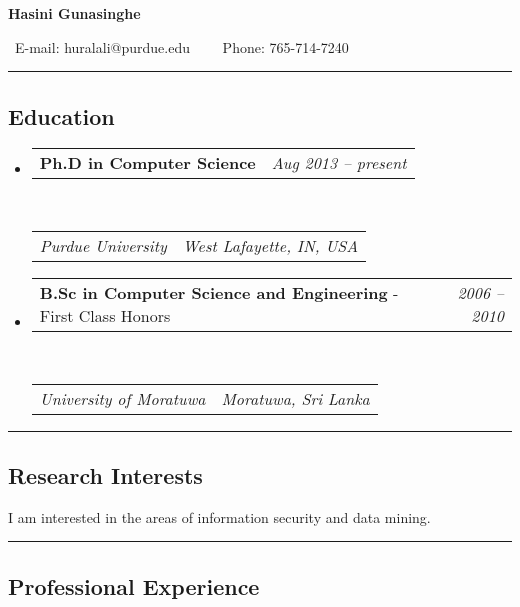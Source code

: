 \documentclass[10pt,letterpaper]{article}
\makeatletter
\newcommand{\headerrow}[2]
{\begin{tabular*}{\linewidth}{l@{\extracolsep{\fill}}r}
	#1 &
	#2 \\
\end{tabular*}}
\makeatother
\begin{document}
\begin{center}
{\LARGE \textbf{Hasini Gunasinghe}}

\textbullet \ E-mail: huralali@purdue.edu\ \ \textbullet
\ \ Phone: 765-714-7240%
\end{center}

\hrule
\vspace{-0.4em}
\subsection*{Education}

\begin{itemize}
	\parskip=0.1em

	\item
	\headerrow
		{\textbf{Ph.D in Computer Science}}
		{\emph{Aug 2013 -- present}}
	\\
	\headerrow
		{\emph{Purdue University}}
		{\emph{West Lafayette, IN, USA}}

	\item
	\headerrow
		{\textbf{B.Sc in Computer Science and Engineering} - First Class Honors}
		{\emph{2006 -- 2010}}
	\\
	\headerrow
		{\emph{University of Moratuwa}}
		{\emph{Moratuwa, Sri Lanka}}
\end{itemize}



\hrule
\vspace{-0.4em}
\subsection*{Research Interests}
\begin{itemize*}
	\item I am interested in the areas of information security and data mining.
\end{itemize*}


\hrule
\vspace{-0.4em}
\subsection*{Professional Experience}
\end{document}
